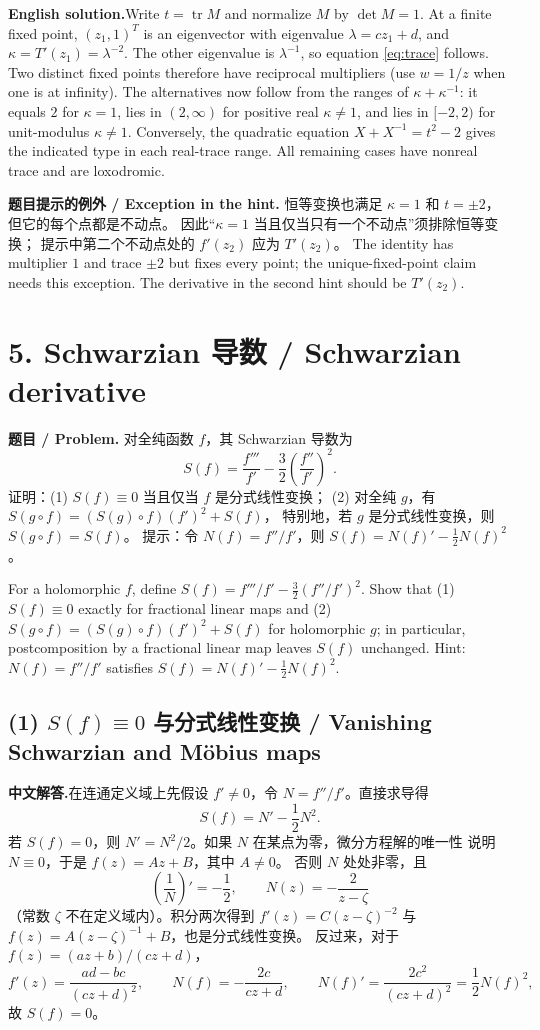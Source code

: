 \documentclass[11pt,a4paper]{ctexart}
\newcommand{\CN}{\textbf{中文解答.}\enspace}
\newcommand{\EN}{\textbf{English solution.}\enspace}
\begin{document}
\EN Write $t=\operatorname{tr}M$ and normalize $M$ by $\det M=1$.
At a finite fixed point, $(z_1,1)^T$ is an eigenvector with eigenvalue
$\lambda=cz_1+d$, and $\kappa=T'(z_1)=\lambda^{-2}$.
The other eigenvalue is $\lambda^{-1}$, so equation \eqref{eq:trace} follows.
Two distinct fixed points therefore have reciprocal multipliers (use $w=1/z$
when one is at infinity). The alternatives now follow from the ranges of
$\kappa+\kappa^{-1}$: it equals $2$ for $\kappa=1$, lies in $(2,\infty)$
for positive real $\kappa\ne1$, and lies in $[-2,2)$ for unit-modulus
$\kappa\ne1$. Conversely, the quadratic equation
$X+X^{-1}=t^2-2$ gives the indicated type in each real-trace range.
All remaining cases have nonreal trace and are loxodromic.

\textbf{题目提示的例外 / Exception in the hint.}
恒等变换也满足 $\kappa=1$ 和 $t=\pm2$，但它的每个点都是不动点。
因此“$\kappa=1$ 当且仅当只有一个不动点”须排除恒等变换；
提示中第二个不动点处的 $f'(z_2)$ 应为 $T'(z_2)$。
The identity has multiplier $1$ and trace $\pm2$ but fixes every point;
the unique-fixed-point claim needs this exception. The derivative in the
second hint should be $T'(z_2)$.

\section*{5. Schwarzian 导数 / Schwarzian derivative}
\textbf{题目 / Problem.} 对全纯函数 $f$，其 Schwarzian 导数为
\[
 S(f)=\frac{f'''}{f'}-\frac32\left(\frac{f''}{f'}\right)^2.
\]
证明：(1) $S(f)\equiv0$ 当且仅当 $f$ 是分式线性变换；
(2) 对全纯 $g$，有 $S(g\circ f)=(S(g)\circ f)(f')^2+S(f)$，
特别地，若 $g$ 是分式线性变换，则 $S(g\circ f)=S(f)$。
提示：令 $N(f)=f''/f'$，则 $S(f)=N(f)'-\tfrac12N(f)^2$。

For a holomorphic $f$, define $S(f)=f'''/f'-\tfrac32(f''/f')^2$.
Show that (1) $S(f)\equiv0$ exactly for fractional linear maps and
(2) $S(g\circ f)=(S(g)\circ f)(f')^2+S(f)$ for holomorphic $g$;
in particular, postcomposition by a fractional linear map leaves
$S(f)$ unchanged. Hint: $N(f)=f''/f'$ satisfies
$S(f)=N(f)'-\tfrac12N(f)^2$.

\subsection*{(1) $S(f)\equiv0$ 与分式线性变换 / Vanishing Schwarzian and M\"obius maps}
\CN 在连通定义域上先假设 $f'\ne0$，令 $N=f''/f'$。直接求导得
\[
 S(f)=N'-\frac12N^2.
\]
若 $S(f)=0$，则 $N'=N^2/2$。如果 $N$ 在某点为零，微分方程解的唯一性
说明 $N\equiv0$，于是 $f(z)=Az+B$，其中 $A\ne0$。
否则 $N$ 处处非零，且
\[
 \left(\frac1N\right)'=-\frac12,
 \qquad N(z)=-\frac{2}{z-\zeta}
\]
（常数 $\zeta$ 不在定义域内）。积分两次得到
$f'(z)=C(z-\zeta)^{-2}$ 与
$f(z)=A(z-\zeta)^{-1}+B$，也是分式线性变换。
反过来，对于 $f(z)=(az+b)/(cz+d)$，
\[
 f'(z)=\frac{ad-bc}{(cz+d)^2},\qquad
 N(f)=-\frac{2c}{cz+d},\qquad
 N(f)'=\frac{2c^2}{(cz+d)^2}=\frac12N(f)^2,
\]
故 $S(f)=0$。
\end{document}
